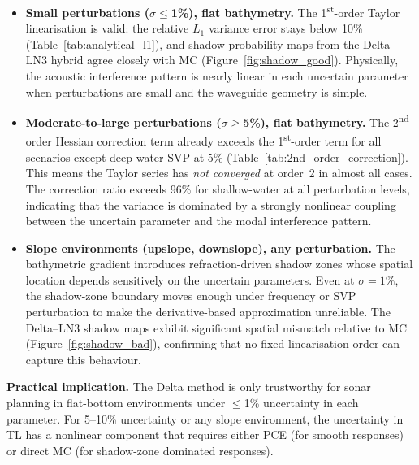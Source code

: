 \documentclass[11pt,a4paper]{article}
\begin{document}
\begin{itemize}
  \item \textbf{Small perturbations ($\sigma\leq$1\%), flat bathymetry.}
        The 1\textsuperscript{st}-order Taylor linearisation is valid: the relative
        $L_1$ variance error stays below 10\% (Table~\ref{tab:analytical_l1}), and
        shadow-probability maps from the Delta--LN3 hybrid agree closely with MC
        (Figure~\ref{fig:shadow_good}).
        Physically, the acoustic interference pattern is nearly linear in each
        uncertain parameter when perturbations are small and the waveguide geometry
        is simple.

  \item \textbf{Moderate-to-large perturbations ($\sigma\geq$5\%), flat bathymetry.}
        The 2\textsuperscript{nd}-order Hessian correction term already exceeds the
        1\textsuperscript{st}-order term for all scenarios except deep-water SVP at 5\%
        (Table~\ref{tab:2nd_order_correction}).
        This means the Taylor series has \emph{not converged} at order~2 in almost all cases.
        The correction ratio exceeds 96\% for shallow-water at all perturbation levels,
        indicating that the variance is dominated by a strongly nonlinear coupling between
        the uncertain parameter and the modal interference pattern.

  \item \textbf{Slope environments (upslope, downslope), any perturbation.}
        The bathymetric gradient introduces refraction-driven shadow zones whose spatial
        location depends sensitively on the uncertain parameters.
        Even at $\sigma=1\%$, the shadow-zone boundary moves enough under frequency or
        SVP perturbation to make the derivative-based approximation unreliable.
        The Delta--LN3 shadow maps exhibit significant spatial mismatch relative to MC
        (Figure~\ref{fig:shadow_bad}), confirming that no fixed linearisation order
        can capture this behaviour.
\end{itemize}

\textbf{Practical implication.} The Delta method is only trustworthy for sonar
planning in flat-bottom environments under $\leq$1\% uncertainty in each parameter.
For 5--10\% uncertainty or any slope environment, the uncertainty in TL has a
nonlinear component that requires either PCE (for smooth responses) or direct MC
(for shadow-zone dominated responses).

\end{document}
